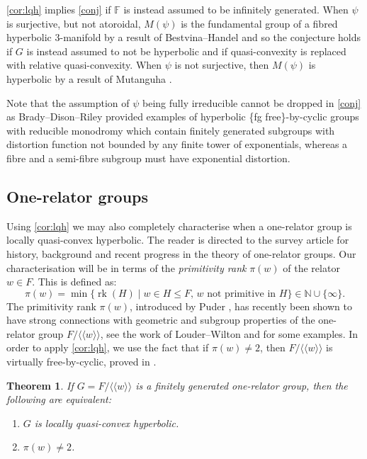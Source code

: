 \documentclass[11pt, a4paper]{amsart}
\newtheorem{theorem}{Theorem}[section]
\theoremstyle{definition}
\newcommand{\N}{\mathbb{N}}
\newcommand{\F}{\mathbb{F}}
\newcommand{\normal}[1]{\langle\!\langle #1 \rangle\!\rangle}
\DeclareMathOperator{\rk}{rk}
\begin{document}
\cref{cor:lqh} implies \cref{conj} if $\F$ is instead assumed to be infinitely generated. When $\psi$ is surjective, but not atoroidal, $M(\psi)$ is the fundamental group of a fibred hyperbolic 3-manifold by a result of Bestvina--Handel \cite{BH92} and so the conjecture holds if $G$ is instead assumed to not be hyperbolic and if quasi-convexity is replaced with relative quasi-convexity. When $\psi$ is not surjective, then $M(\psi)$ is hyperbolic by a result of Mutanguha \cite{Mu20}. 

Note that the assumption of $\psi$ being fully irreducible cannot be dropped in \cref{conj} as Brady--Dison--Riley \cite{BDR13} provided examples of hyperbolic \{fg free\}-by-cyclic groups with reducible monodromy which contain finitely generated subgroups with distortion function not bounded by any finite tower of exponentials, whereas a fibre and a semi-fibre subgroup must have exponential distortion.


\subsection{One-relator groups}

Using \cref{cor:lqh} we may also completely characterise when a one-relator group is locally quasi-convex hyperbolic. The reader is directed to the survey article \cite{CFL25} for history, background and recent progress in the theory of one-relator groups. Our characterisation will be in terms of the \emph{primitivity rank} $\pi(w)$ of the relator $w\in F$. This is defined as:
\[
\pi(w) = \min\{\rk(H) \mid w\in H\leqslant F, \, w \text{ not primitive in } H\}\in \N\cup \{\infty\}.
\]
The primitivity rank $\pi(w)$, introduced by Puder \cite{Pu14}, has recently been shown to have strong connections with geometric and subgroup properties of the one-relator group $F/\normal{w}$, see the work of Louder--Wilton \cite{LW22,LW24} and \cite{Li25} for some examples. In order to apply \cref{cor:lqh}, we use the fact that if $\pi(w)\neq 2$, then $F/\normal{w}$ is virtually free-by-cyclic, proved in \cite{KL24b}.

\begin{theorem}
\label{thm:one-relator}
If $G = F/\normal{w}$ is a finitely generated one-relator group, then the following are equivalent:
\begin{enumerate}
\item $G$ is locally quasi-convex hyperbolic.
\item $\pi(w)\neq 2$.
\end{enumerate}
\end{theorem}
\end{document}
